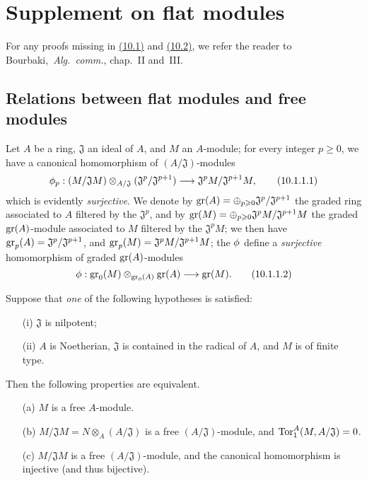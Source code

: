 \section{Supplement on flat modules}
\label{section:0.10}

For any proofs missing in \hyperref[subsection:0.10.1]{(10.1)} and \hyperref[subsection:0.10.2]{(10.2)}, we refer the reader to Bourbaki,~\emph{Alg.~comm.}, chap.~II and~III.

\subsection{Relations between flat modules and free modules}
\label{subsection:0.10.1}

\begin{env}[10.1.1]
\label{0.10.1.1}
Let $A$ be a ring, $\mathfrak{J}$ an ideal of $A$, and $M$ an $A$-module;
for every integer $p\geq0$, we have a canonical homomorphism of $(A/\mathfrak{J})$-modules
\[
\label{eq:0.10.1.1.1}
  \vphi_p:(M/\mathfrak{J}M)\otimes_{A/\mathfrak{J}}(\mathfrak{J}^p/\mathfrak{J}^{p+1})\to\mathfrak{J}^pM/\mathfrak{J}^{p+1}M,
  \tag{10.1.1.1}
\]
which is evidently \emph{surjective}.
We denote by $\operatorname{gr}(A)=\oplus_{p\geqslant0}\mathfrak{J}^p/\mathfrak{J}^{p+1}$ the graded ring associated to $A$ filtered by the $\mathfrak{J}^p$, and by $\operatorname{gr}(M)=\oplus_{p\geqslant0}\mathfrak{J}^pM/\mathfrak{J}^{p+1}M$ the graded $\operatorname{gr}(A)$-module associated to $M$ filtered by the $\mathfrak{J}^pM$;
we then have $\operatorname{gr}_p(A)=\mathfrak{J}^p/\mathfrak{J}^{p+1}$, and $\operatorname{gr}_p(M)=\mathfrak{J}^pM/\mathfrak{J}^{p+1}M$;
the $\phi$ define a \emph{surjective} homomorphism of graded $\operatorname{gr}(A)$-modules
\[
\label{eq:0.10.1.1.2}
  \vphi:\gr_0(M)\otimes_{\gr_0(A)}\gr(A)\to\gr(M).
  \tag{10.1.1.2}
\]
\end{env}

\begin{env}[10.1.2]
\label{0.10.1.2}
Suppose that \emph{one} of the following hypotheses is satisfied:
\begin{enumerate}
  \item[(i)] $\mathfrak{J}$ is nilpotent;
  \item[(ii)] $A$ is Noetherian, $\mathfrak{J}$ is contained in the radical of $A$, and $M$ is of finite type.
\end{enumerate}
Then the following properties are equivalent.
\begin{enumerate}
  \item[(a)] $M$ is a free $A$-module.
  \item[(b)] $M/\mathfrak{J}M=N\otimes_A(A/\mathfrak{J})$ is a free $(A/\mathfrak{J})$-module, and $\operatorname{Tor}_1^A(M,A/\mathfrak{J})=0$.
  \item[(c)] $M/\mathfrak{J}M$ is a free $(A/\mathfrak{J})$-module, and the canonical homomorphism  is injective (and thus bijective).
\end{enumerate}
\end{env}

